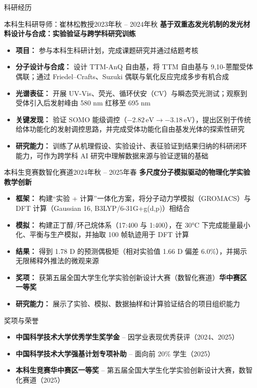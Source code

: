 \documentclass[]{mcdowellcv}
\begin{document}
\begin{cvsection}{科研经历}
	\begin{cvsubsection}{本科生科研}{导师：崔林松教授}{2023年秋 -- 2024年秋}
		\textbf{基于双重态发光机制的发光材料设计与合成：实验验证与跨学科研究训练}
		\begin{itemize}
			\item \textbf{项目：} 参与本科生科研计划，完成课题研究并通过结题考核
			\item \textbf{分子设计与合成：} 设计 TTM-AnQ 自由基，将 TTM 自由基与 9,10-蒽醌受体偶联；通过 Friedel--Crafts、Suzuki 偶联与氧化反应完成多步有机合成
			\item \textbf{光谱表征：} 开展 UV-Vis、荧光、循环伏安（CV）与瞬态荧光测试；观察到受体引入后发射峰由 580 nm 红移至 695 nm
			\item \textbf{关键发现：} 验证 SOMO 能级调控（$-2.82\,\mathrm{eV} \to -3.18\,\mathrm{eV}$），提出区别于传统给体功能化的发射调控思路，并完成受体功能化自由基发光体的探索性研究
			\item \textbf{研究能力：} 训练了从机理假设、实验设计、表征验证到结果归纳的科研闭环能力，可作为跨学科 AI 研究中理解数据来源与验证逻辑的基础
		\end{itemize}
	\end{cvsubsection}

	\begin{cvsubsection}{本科生竞赛}{数智化赛道}{2024年秋 -- 2025年春}
		\textbf{多尺度分子模拟驱动的物理化学实验教学创新}
		\begin{itemize}
			\item \textbf{框架：} 构建“实验 + 计算”一体化方案，将分子动力学模拟（GROMACS）与 DFT 计算（Gaussian 16, B3LYP/6-31G+g(d,p)）相结合
			\item \textbf{模拟：} 构建正丁醇/环己烷体系（17:400 与 1:400），在 30°C 下完成能量最小化、平衡与生产模拟，并抽取 100 帧轨迹用于 DFT 计算
			\item \textbf{结果：} 得到 1.78 D 的预测偶极矩（相对实验值 1.66 D 偏差 6.0\%），并揭示无限稀释外推法的微观来源
			\item \textbf{奖项：} 获第五届全国大学生化学实验创新设计大赛（数智化赛道）\textbf{华中赛区一等奖}
			\item \textbf{研究能力：} 展示了实验、模拟、数据抽样和计算验证结合的项目组织能力
		\end{itemize}
	\end{cvsubsection}
\end{cvsection}

\begin{cvsection}{奖项与荣誉}
	\begin{cvsubsection}{}{}{}
		\begin{itemize}
			\item \textbf{中国科学技术大学优秀学生奖学金} -- 因学业表现优秀获评（2024、2025）
			\item \textbf{中国科学技术大学强基计划专项补助} -- 面向前 20\% 学生（2025）
			\item \textbf{本科生竞赛华中赛区一等奖} -- 第五届全国大学生化学实验创新设计大赛，数智化赛道（2025）
		\end{itemize}
	\end{cvsubsection}
\end{cvsection}
\end{document}
